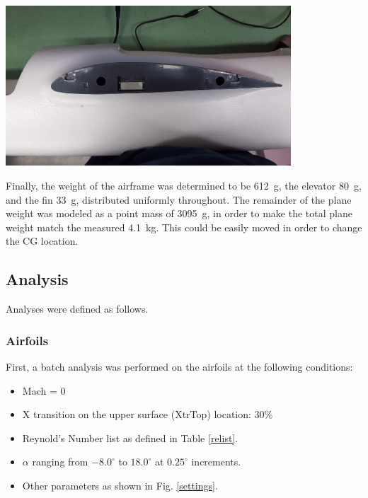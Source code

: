 \documentclass[]{auvsi_doc}
\begin{document}
\begin{center}
	\includegraphics[width=0.8\textwidth]{./airfoils.png}
	\label{airfoil}
\end{center}

Finally, the weight of the airframe was determined to be 612~g, the elevator 80~g, and the fin 33~g, distributed uniformly throughout. The remainder of the plane weight was modeled as a point mass of 3095~g, in order to make the total plane weight match the measured 4.1~kg. This could be easily moved in order to change the CG location.

\subsection{Analysis}

Analyses were defined as follows.

\subsubsection{Airfoils}
First, a batch analysis was performed on the airfoils at the following conditions:
\begin{itemize}
	\item Mach = 0
	\item X transition on the upper surface (XtrTop) location: 30\%
	\item Reynold's Number list as defined in Table \ref{relist}.
	\item $\alpha$ ranging from $-8.0^\circ$ to $18.0^\circ$ at $0.25^\circ$ increments.
	\item Other parameters as shown in Fig. \ref{settings}.
\end{itemize}
\end{document}

